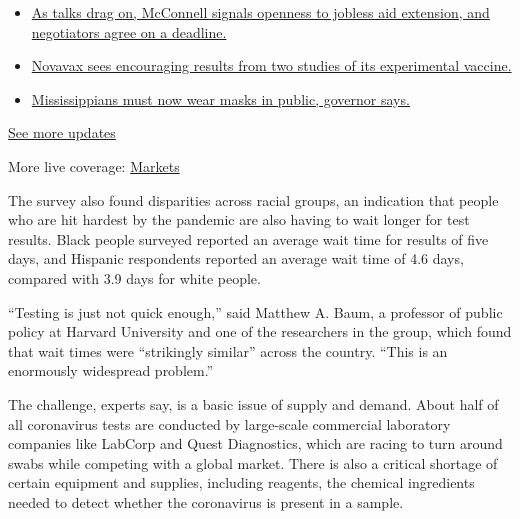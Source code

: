 \begin{itemize}
\tightlist
\item
  \href{https://www.nytimes3xbfgragh.onion/2020/08/04/world/coronavirus-cases.html?action=click\&pgtype=Article\&state=default\&region=MAIN_CONTENT_1\&context=storylines_live_updates\#link-762df92}{As
  talks drag on, McConnell signals openness to jobless aid extension,
  and negotiators agree on a deadline.}
\item
  \href{https://www.nytimes3xbfgragh.onion/2020/08/04/world/coronavirus-cases.html?action=click\&pgtype=Article\&state=default\&region=MAIN_CONTENT_1\&context=storylines_live_updates\#link-1228a480}{Novavax
  sees encouraging results from two studies of its experimental
  vaccine.}
\item
  \href{https://www.nytimes3xbfgragh.onion/2020/08/04/world/coronavirus-cases.html?action=click\&pgtype=Article\&state=default\&region=MAIN_CONTENT_1\&context=storylines_live_updates\#link-794484ed}{Mississippians
  must now wear masks in public, governor says.}
\end{itemize}

\href{https://www.nytimes3xbfgragh.onion/2020/08/04/world/coronavirus-cases.html?action=click\&pgtype=Article\&state=default\&region=MAIN_CONTENT_1\&context=storylines_live_updates}{See
more updates}

More live coverage:
\href{https://www.nytimes3xbfgragh.onion/live/2020/08/04/business/stock-market-today-coronavirus?action=click\&pgtype=Article\&state=default\&region=MAIN_CONTENT_1\&context=storylines_live_updates}{Markets}

The survey also found disparities across racial groups, an indication
that people who are hit hardest by the pandemic are also having to wait
longer for test results. Black people surveyed reported an average wait
time for results of five days, and Hispanic respondents reported an
average wait time of 4.6 days, compared with 3.9 days for white people.

``Testing is just not quick enough,'' said Matthew A. Baum, a professor
of public policy at Harvard University and one of the researchers in the
group, which found that wait times were ``strikingly similar'' across
the country. ``This is an enormously widespread problem.''

The challenge, experts say, is a basic issue of supply and demand. About
half of all coronavirus tests are conducted by large-scale commercial
laboratory companies like LabCorp and Quest Diagnostics, which are
racing to turn around swabs while competing with a global market. There
is also a critical shortage of certain equipment and supplies, including
reagents, the chemical ingredients needed to detect whether the
coronavirus is present in a sample.

